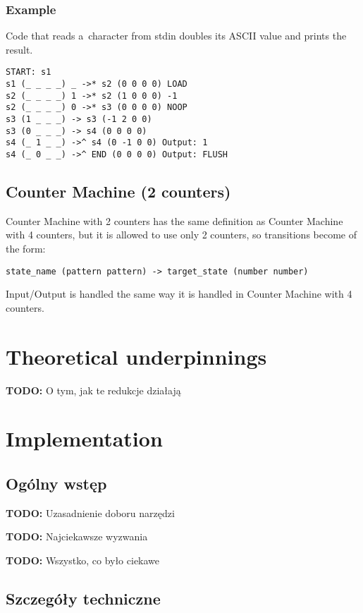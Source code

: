 \documentclass[english,shortabstract,mgr]{iithesis}
\newcommand{\todo}[1]{\textbf{TODO:} #1}
\begin{document}
\subsection{Example}

Code that reads a~character from stdin doubles its ASCII value and prints the result.
\begin{verbatim}
START: s1
s1 (_ _ _ _) _ ->* s2 (0 0 0 0) LOAD
s2 (_ _ _ _) 1 ->* s2 (1 0 0 0) -1
s2 (_ _ _ _) 0 ->* s3 (0 0 0 0) NOOP
s3 (1 _ _ _) -> s3 (-1 2 0 0)
s3 (0 _ _ _) -> s4 (0 0 0 0)
s4 (_ 1 _ _) ->^ s4 (0 -1 0 0) Output: 1
s4 (_ 0 _ _) ->^ END (0 0 0 0) Output: FLUSH
\end{verbatim}

\section {Counter Machine (2 counters)}

Counter Machine with 2 counters has the same definition as
Counter Machine with 4 counters, but it is allowed to use only
2 counters, so transitions become of the form:

\begin{verbatim}
state_name (pattern pattern) -> target_state (number number)
\end{verbatim}

Input/Output is handled the same way it is handled in Counter Machine with 4 counters.


\chapter{Theoretical underpinnings}

\todo{O tym, jak te redukcje działają}

\chapter{Implementation}

\section{Ogólny wstęp}

\todo{Uzasadnienie doboru narzędzi}

\todo{Najciekawsze wyzwania}

\todo{Wszystko, co było ciekawe}

\section{Szczegóły techniczne}
\end{document}
